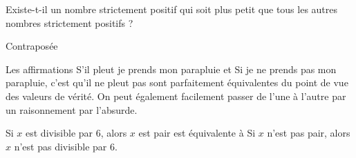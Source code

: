 \begin{frame}
  \begin{question}
    Existe-t-il un nombre strictement positif qui soit plus petit que tous les autres nombres strictement positifs ?
  \end{question}
\end{frame}

\begin{frame}{Contraposée}
  \begin{example}
    Les affirmations \og S'il pleut je prends mon parapluie\fg{} et \og Si je ne prends pas mon parapluie, c'est qu'il ne pleut pas\fg{} sont parfaitement équivalentes du point de vue des valeurs de vérité. On peut également facilement passer de l'une à l'autre par un raisonnement par l'absurde.
  \end{example}

\begin{example}
  \og Si \(x\) est divisible par \(6\), alors \(x\) est pair\fg{} est équivalente à \og Si \(x\) n'est pas pair, alors \(x\) n'est pas divisible par \(6\)\fg{}.
\end{example}
\end{frame}


